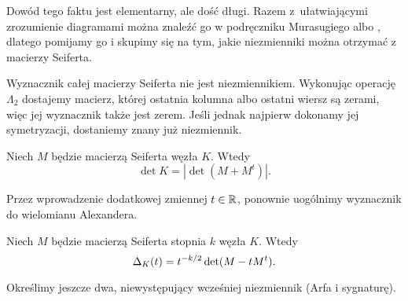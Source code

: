 Dowód tego faktu jest elementarny, ale dość długi.
Razem z~ułatwiającymi zrozumienie diagramami można znaleźć go w podręczniku Murasugiego albo \cite[s. 64]{kawauchi96}, dlatego pomijamy go i skupimy się na tym, jakie niezmienniki można otrzymać z macierzy Seiferta.

Wyznacznik całej macierzy Seiferta nie jest niezmiennikiem.
Wykonując operację $\Lambda_2$ dostajemy macierz, której ostatnia kolumna albo ostatni wiersz są zerami, więc jej wyznacznik także jest zerem.
Jeśli jednak najpierw dokonamy jej symetryzacji, dostaniemy znany już niezmiennik.

\begin{proposition}
    Niech $M$ będzie macierzą Seiferta węzła $K$.
    Wtedy
    \begin{equation}
        \det K = |\det(M + M^t)|.
    \end{equation}
\end{proposition}

%
Przez wprowadzenie dodatkowej zmiennej $t \in \mathbb R$, ponownie uogólnimy wyznacznik do wielomianu Alexandera.

\begin{proposition}
    Niech $M$ będzie macierzą Seiferta stopnia $k$ węzła $K$.
    Wtedy
    \begin{equation}
        \Delta_K (t) = t^{-k/2}\det(M - tM^t).
    \end{equation}
\end{proposition}

Określimy jeszcze dwa, niewystępujący wcześniej niezmiennik (Arfa i sygnaturę).



